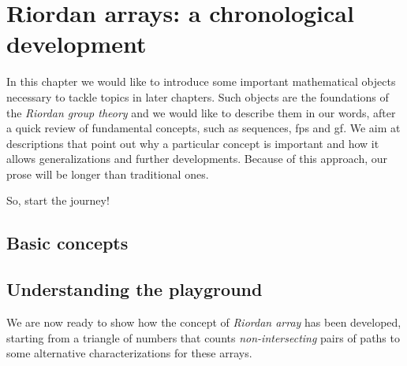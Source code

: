 
\chapter{Riordan arrays: a chronological development}
\label{ch:chronologial:development}

In this chapter we would like to introduce some important mathematical objects
necessary to tackle topics in later chapters. Such objects are the foundations
of the \emph{Riordan group theory} and we would like to describe them in our
words, after a quick review of fundamental concepts, such as sequences,
\ac{fps} and \ac{gf}.  We aim at descriptions that point out why a particular
concept is important and how it allows generalizations and further
developments. Because of this approach, our prose will be longer than
traditional ones.


So, start the journey!

\section{Basic concepts}



\section{Understanding the playground}

We are now ready to show how the concept of \emph{Riordan array} has been
developed, starting from a triangle of numbers that counts
\emph{non-intersecting} pairs of paths to some alternative characterizations
for these arrays.








